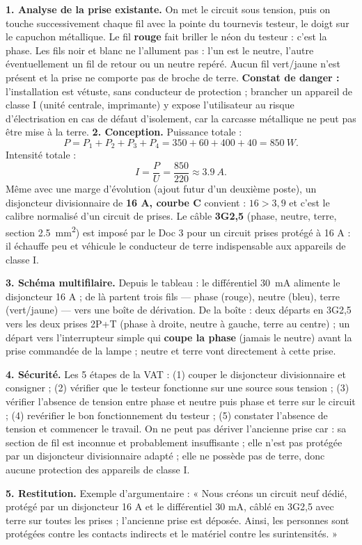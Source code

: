 \documentclass[11pt]{article}
\newcommand{\cle}[1]{{\popxbold\color{popdark}#1}}
\newcounter{popsec}
\newcounter{popsub}
\newcommand{\courssub}[1]{%
  \stepcounter{popsub}%
  \par\vspace{9pt}\noindent{\popxbold\fontsize{11.5}{13}\selectfont\color{popink}{\color{poporange}\thepopsec.\thepopsub}\hspace{6pt}#1}\par\nopagebreak\vspace{4pt}
}
\begin{document}
\courssub{Démarche et corrigé commenté}

\begin{exoresolu}
\textbf{1. Analyse de la prise existante.} On met le circuit sous tension, puis on touche successivement chaque fil avec la pointe du tournevis testeur, le doigt sur le capuchon métallique. Le fil \textbf{rouge} fait briller le néon du testeur : c'est la \cle{phase}. Les fils noir et blanc ne l'allument pas : l'un est le \cle{neutre}, l'autre éventuellement un fil de retour ou un neutre repéré. Aucun fil vert/jaune n'est présent et la prise ne comporte pas de broche de terre. \textbf{Constat de danger :} l'installation est vétuste, sans conducteur de protection ; brancher un appareil de classe I (unité centrale, imprimante) y expose l'utilisateur au risque d'électrisation en cas de défaut d'isolement, car la carcasse métallique ne peut pas être mise à la terre.
\tcblower
\textbf{2. Conception.} Puissance totale :
\[ P = P_1 + P_2 + P_3 + P_4 = 350 + 60 + 400 + 40 = \SI{850}{W}. \]
Intensité totale :
\[ I = \frac{P}{U} = \frac{850}{220} \approx \SI{3,9}{A}. \]
Même avec une marge d'évolution (ajout futur d'un deuxième poste), un disjoncteur divisionnaire de \textbf{16 A, courbe C} convient : $16 > 3{,}9$ et c'est le calibre normalisé d'un circuit de prises. Le câble \textbf{3G2,5} (phase, neutre, terre, section \SI{2,5}{mm^2}) est imposé par le Doc 3 pour un circuit prises protégé à 16 A : il échauffe peu et véhicule le conducteur de terre indispensable aux appareils de classe I.

\textbf{3. Schéma multifilaire.} Depuis le tableau : le différentiel \SI{30}{mA} alimente le disjoncteur 16 A ; de là partent trois fils — phase (rouge), neutre (bleu), terre (vert/jaune) — vers une boîte de dérivation. De la boîte : deux départs en 3G2,5 vers les deux prises 2P+T (phase à droite, neutre à gauche, terre au centre) ; un départ vers l'interrupteur simple qui \textbf{coupe la phase} (jamais le neutre) avant la prise commandée de la lampe ; neutre et terre vont directement à cette prise.

\textbf{4. Sécurité.} Les 5 étapes de la VAT : (1) couper le disjoncteur divisionnaire et consigner ; (2) vérifier que le testeur fonctionne sur une source sous tension ; (3) vérifier l'absence de tension entre phase et neutre puis phase et terre sur le circuit ; (4) revérifier le bon fonctionnement du testeur ; (5) constater l'absence de tension et commencer le travail. On ne peut pas dériver l'ancienne prise car : sa section de fil est inconnue et probablement insuffisante ; elle n'est pas protégée par un disjoncteur divisionnaire adapté ; elle ne possède pas de terre, donc aucune protection des appareils de classe I.

\textbf{5. Restitution.} Exemple d'argumentaire : « Nous créons un circuit neuf dédié, protégé par un disjoncteur 16 A et le différentiel 30 mA, câblé en 3G2,5 avec terre sur toutes les prises ; l'ancienne prise est déposée. Ainsi, les personnes sont protégées contre les contacts indirects et le matériel contre les surintensités. »
\end{exoresolu}
\end{document}
